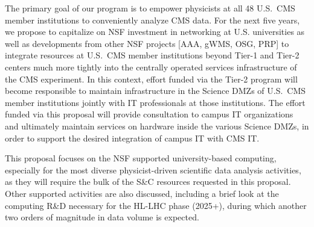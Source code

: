\documentclass[11pt,a4paper]{article}
\begin{document}
The primary goal of our program is to empower physicists at all 48 U.S.~CMS
member institutions to conveniently analyze CMS
data. %
For the next five years, we propose to capitalize on NSF investment in
networking at U.S. universities as well as developments from other NSF
projects [AAA, gWMS, OSG, PRP] to integrate resources at U.S.~CMS member
institutions beyond Tier-1 and Tier-2 centers much more tightly into the
centrally operated services infrastructure of the CMS experiment.  In this
context, effort funded via the Tier-2 program will become responsible to
maintain infrastructure in the Science DMZs of U.S.~CMS member institutions
jointly with IT professionals at those institutions.  The effort funded via
this proposal will provide consultation to campus IT organizations and
ultimately maintain services on hardware inside the various Science DMZs,
in order to support the desired integration of campus IT with CMS IT.


This proposal focuses on the NSF supported university-based computing,
especially for the most diverse %
physicist-driven scientific data analysis activities, as they will require
the bulk of the S\&C resources requested in this proposal.  Other supported
activities are also discussed, including a brief look at the
computing R\&D necessary for the HL-LHC phase (2025+), during which another
two orders of magnitude in data volume is expected.
\end{document}
